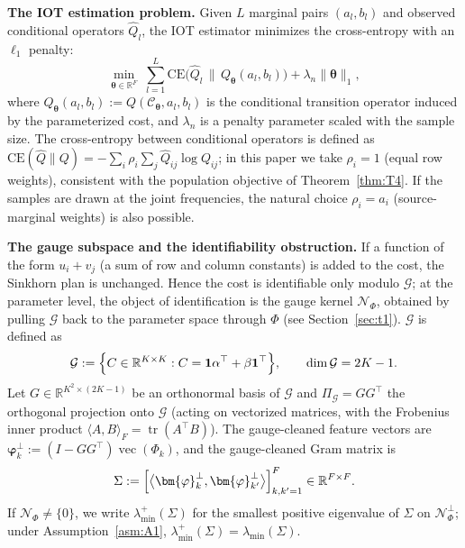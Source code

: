 \documentclass[11pt,a4paper]{article}
\theoremstyle{remark}
\renewcommand{\phi}{\bm{\varphi}}
\begin{document}
\textbf{The IOT estimation problem.} Given $L$ marginal pairs $(a_l,b_l)$ and observed
conditional operators $\widehat Q_l$, the IOT estimator minimizes the cross-entropy with an
$\ell_1$ penalty:
\begin{equation}\label{eq:iot_estimator}
\min_{\bm{\theta}\in\mathbb{R}^F}\;\sum_{l=1}^{L}\mathrm{CE}\bigl(\widehat Q_l\,\|\,Q_{\bm{\theta}}(a_l,b_l)\bigr)+\lambda_n\|\bm{\theta}\|_1,
\end{equation}
where $Q_{\bm{\theta}}(a_l,b_l):=Q(\mathcal{C}_{\bm{\theta}},a_l,b_l)$ is the conditional
transition operator induced by the parameterized cost, and $\lambda_n$ is a penalty
parameter scaled with the sample size. The cross-entropy between conditional operators is
defined as $\mathrm{CE}(\widehat Q\|Q)=-\sum_i\rho_i\sum_j\widehat Q_{ij}\log Q_{ij}$; in
this paper we take $\rho_i=1$ (equal row weights), consistent with the population objective
of Theorem~\ref{thm:T4}. If the samples are drawn at the joint frequencies, the natural
choice $\rho_i=a_i$ (source-marginal weights) is also possible.

\textbf{The gauge subspace and the identifiability obstruction.} If a function of the form
$u_i+v_j$ (a sum of row and column constants) is added to the cost, the Sinkhorn plan is
unchanged. Hence the cost is identifiable only modulo $\mathcal{G}$; at the parameter
level, the object of identification is the gauge kernel $\mathcal{N}_\Phi$, obtained by
pulling $\mathcal{G}$ back to the parameter space through $\Phi$ (see
Section~\ref{sec:t1}). $\mathcal{G}$ is defined as
\begin{equation}\label{eq:gauge_space}
\mathcal{G}:=\Bigl\{C\in\mathbb{R}^{K\times K}:C=\mathbf{1}\alpha^{\top}+\beta\mathbf{1}^{\top}\Bigr\},\qquad \dim\mathcal{G}=2K-1.
\end{equation}
Let $G\in\mathbb{R}^{K^2\times(2K-1)}$ be an orthonormal basis of $\mathcal{G}$ and
$\Pi_{\mathcal{G}}=GG^{\top}$ the orthogonal projection onto $\mathcal{G}$ (acting on
vectorized matrices, with the Frobenius inner product
$\langle A,B\rangle_F=\operatorname{tr}(A^{\top}B)$). The gauge-cleaned feature vectors are
$\phi_k^{\perp}:=(I-GG^{\top})\operatorname{vec}(\Phi_k)$, and the gauge-cleaned Gram
matrix is
\begin{equation}\label{eq:gram_matrix}
\Sigma:=\Bigl[\bigl\langle\phi_k^{\perp},\phi_{k'}^{\perp}\bigr\rangle\Bigr]_{k,k'=1}^{F}\in\mathbb{R}^{F\times F}.
\end{equation}
If $\mathcal{N}_\Phi\neq\{0\}$, we write $\lambda_{\min}^{+}(\Sigma)$ for the smallest
positive eigenvalue of $\Sigma$ on $\mathcal{N}_\Phi^{\perp}$; under
Assumption~\ref{asm:A1}, $\lambda_{\min}^{+}(\Sigma)=\lambda_{\min}(\Sigma)$.
\end{document}

